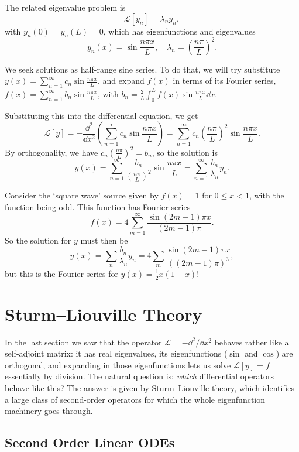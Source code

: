 \documentclass[a4paper]{scrartcl}
\begin{document}
The related eigenvalue problem is
$$
\mathcal{L}[y_n] = \lambda_n y_n,
$$
with $y_n(0) = y_n(L) = 0$, which has eigenfunctions and eigenvalues
$$
y_n(x) = \sin \frac{n \pi x}{L}, \quad \lambda_n = \left(\frac{n \pi }{L}\right)^2.
$$

We seek solutions as half-range sine series. To do that, we will try substitute $y(x) = \sum_{n = 1}^{\infty} c_n \sin \frac{n \pi x}{L}$, and expand $f(x)$ in terms of its Fourier series, $f(x) = \sum_{n = 1}^{\infty} b_n \sin \frac{n \pi x}{L}$, with $b_n = \frac{2}{L} \int_0^L f(x) \sin \frac{n \pi x}{L} \dd x$.

Substituting this into the differential equation, we get
$$
\mathcal{L}[y] = - \frac{\dd^2}{\dd x^2} \left(\sum_{n = 1}^{\infty} c_n \sin \frac{n \pi x}{L}\right) = \sum_{n = 1}^{\infty} c_n \left(\frac{n \pi}{L}\right)^2 \sin \frac{n \pi x}{L}.
$$
By orthogonality, we have $c_n \left(\frac{n \pi }{L}\right)^2 = b_n$, so the solution is
$$
y(x) = \sum_{n = 1}^{\infty} \frac{b_n}{\left(\frac{n \pi }{L}\right)^2}\sin \frac{n \pi x}{L} = \sum_{n = 1}^{\infty} \frac{b_n}{\lambda_n} y_n.
$$

\begin{example}
    Consider the `square wave' source given by $f(x) = 1$ for $0 \leq x < 1$, with the function being odd. This function has Fourier series
    $$
    f(x)=4 \sum_{m=1}^{\infty} \frac{\sin (2 m-1) \pi x}{(2 m-1) \pi}.
    $$
    So the solution for $y$ must then be
    $$
    y(x)=\sum_{n} \frac{b_{n}}{\lambda_{n}} y_{n}=4 \sum_{m} \frac{\sin (2 m-1) \pi x}{((2 m-1) \pi)^{3}},
    $$
    but this is the Fourier series for $y(x) = \frac{1}{2}x(1 - x)$!
\end{example}

\section{Sturm--Liouville Theory}

In the last section we saw that the operator $\mathcal{L} = -\dd^2/\dd x^2$ behaves rather like a self-adjoint matrix: it has real eigenvalues, its eigenfunctions ($\sin$ and $\cos$) are orthogonal, and expanding in those eigenfunctions lets us solve $\mathcal{L}[y] = f$ essentially by division.
The natural question is: \emph{which} differential operators behave like this? The answer is given by Sturm--Liouville theory, which identifies a large class of second-order operators for which the whole eigenfunction machinery goes through.

\subsection{Second Order Linear ODEs}
\end{document}
